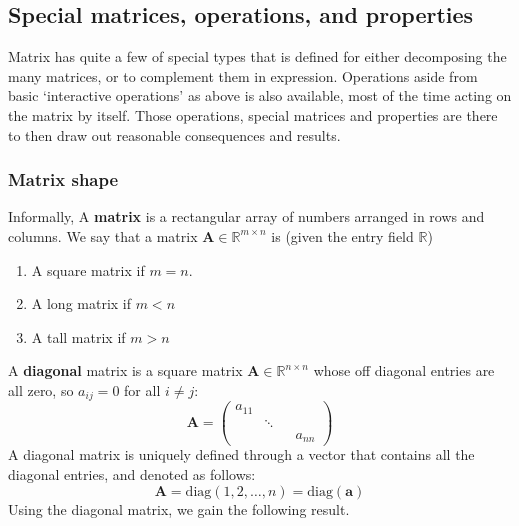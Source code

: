 \subsection{Special matrices, operations, and properties}
Matrix has quite a few of special types that is defined for either decomposing the many matrices, or to complement them in expression. Operations aside from basic `interactive operations' as above is also available, most of the time acting on the matrix by itself. Those operations, special matrices and properties are there to then draw out reasonable consequences and results. 
\subsubsection{Matrix shape}
Informally, A \textbf{matrix} is a rectangular array of numbers arranged in rows and columns. We say that a matrix $\mathbf{A}\in \mathbb{R}^{m\times n}$ is (given the entry field $\mathbb{R}$)
\begin{enumerate}[topsep=1pt,itemsep=1pt]
    \item A square matrix if $m=n$. 
    \item A long matrix if $m<n$
    \item A tall matrix if $m>n$
\end{enumerate}
A \textbf{diagonal} matrix is a square matrix $\mathbf{A}\in \mathbb{R}^{n\times n}$ whose off diagonal entries are all zero, so $a_{ij}=0$ for all $i\neq j$: 
\begin{equation}
    \mathbf{A}=\begin{pmatrix}
a_{11}  &  &  &  \\
 & \ddots  &  &  \\
 &  &  & a_{nn}
\end{pmatrix}
\end{equation}
A diagonal matrix is uniquely defined through a vector that contains all the diagonal entries, and denoted as follows:
\begin{equation}
    \mathbf{A}=\mathrm{diag}(1,2,\dots,n)=\mathrm{diag}(\mathbf{a})
\end{equation}
Using the diagonal matrix, we gain the following result. 
